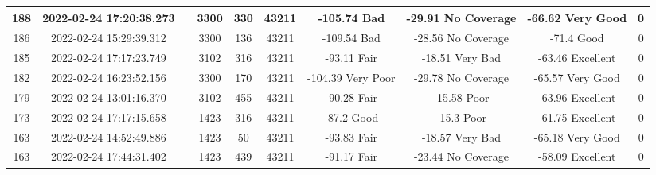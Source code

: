 \begin{longtable*}{|c|c|c|c|c|c|c|c|c|c|}
188&2022-02-24 17:20:38.273&&3300&330&43211& -105.74   Bad         & -29.91    No Coverage & -66.62    Very Good   & 0\\\hline
{}186&2022-02-24 15:29:39.312&&3300&136&43211& -109.54   Bad         & -28.56    No Coverage & -71.4     Good        & 0\\\hline
{}185&2022-02-24 17:17:23.749&&3102&316&43211& -93.11    Fair        & -18.51    Very Bad    & -63.46    Excellent   & 0\\\hline
{}182&2022-02-24 16:23:52.156&&3300&170&43211& -104.39   Very Poor   & -29.78    No Coverage & -65.57    Very Good   & 0\\\hline
{}179&2022-02-24 13:01:16.370&&3102&455&43211& -90.28    Fair        & -15.58    Poor        & -63.96    Excellent   & 0\\\hline
{}173&2022-02-24 17:17:15.658&&1423&316&43211& -87.2     Good        & -15.3     Poor        & -61.75    Excellent   & 0\\\hline
{}163&2022-02-24 14:52:49.886&&1423&50&43211& -93.83    Fair        & -18.57    Very Bad    & -65.18    Very Good   & 0\\\hline
{}163&2022-02-24 17:44:31.402&&1423&439&43211& -91.17    Fair        & -23.44    No Coverage & -58.09    Excellent   & 0\\\hline

\end{longtable*}

